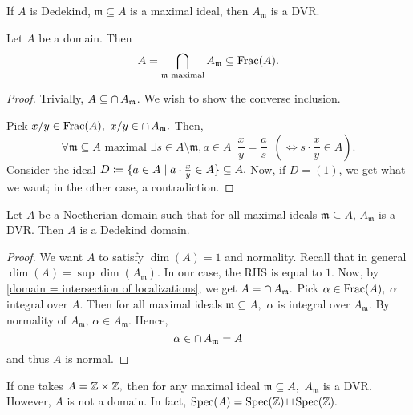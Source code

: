 \begin{corollary}
  If \(A\) is Dedekind, \(\mathfrak m \subseteq A\) is a maximal ideal, then \(A_{\mathfrak m}\) is a DVR.
\end{corollary}

\begin{lemma}
  \label{domain = intersection of localizations}
  Let \(A\) be a domain. Then
  \[A = \operatorname*{\bigcap}_{\mathfrak m \text{ maximal}} A_{\mathfrak m} \subseteq \mathrm{Frac}(A).\]
\end{lemma}
\begin{proof}
  Trivially, \(A \subseteq \operatorname{\cap} A_{\mathfrak m}\). We wish to show the converse inclusion.

  Pick \(x / {y} \in \mathrm{Frac}(A),\) \(x/{y} \in \operatorname{\cap} A_{\mathfrak m}.\)
  Then,
  \[\forall \mathfrak m \subseteq A \text{ maximal } \exists s \in A \setminus \mathfrak m, a \in A \enspace \frac{x}{y} = \frac{a}{s} \enspace (\iff s \cdot \frac{x}{y} \in A).\]
  Consider the ideal
  \(D \coloneqq \{a \in A \mathrel{|} a \cdot \frac{x}{y} \in A\} \subseteq A.\)
  Now, if \(D = (1)\), we get what we want; in the other case, a contradiction.
\end{proof}

\begin{prop}
  Let \(A\) be a Noetherian domain such that for all maximal ideals \(\mathfrak m \subseteq A\), \(A_\mathfrak m\) is a DVR.
  Then \(A\) is a Dedekind domain.
\end{prop}
\begin{proof}
  We want \(A\) to satisfy \(\dim(A) = 1\) and normality.
  Recall that in general
  \(\dim(A) = \sup \dim(A_{\mathfrak m}).\)
  In our case, the RHS is equal to \(1.\)
  Now, by \cref{domain = intersection of localizations}, we get \(A = \operatorname{\cap} A_{\mathfrak m}.\)
  Pick \(\alpha \in \mathrm{Frac}(A),\) \(\alpha\) integral over \(A.\)
  Then for all maximal ideals \(\mathfrak m \subseteq A,\) \(\alpha\) is integral over \(A_{\mathfrak m}\). By normality of \(A_{\mathfrak m}\), \(\alpha \in A_{\mathfrak m}.\)
  Hence,
  \[\alpha \in \operatorname{\cap} A_{\mathfrak m} = A\]
  and thus \(A\) is normal.
\end{proof}

\begin{example}
  If one takes \(A = \mathbb Z \times \mathbb Z,\) then for any maximal ideal \(\mathfrak m \subseteq A,\) \(A_{\mathfrak m}\) is a DVR. However, \(A\) is not a domain.
  In fact, \(\text{Spec}(A) = \text{Spec}(\mathbb Z) \operatorname{\sqcup} \text{Spec}(\mathbb Z).\)
\end{example}


